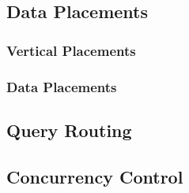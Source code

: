\subsection{Data Placements}
\subsubsection{Vertical Placements} 
\subsubsection{Data Placements}

\subsection{Query Routing}

\subsection{Concurrency Control}


